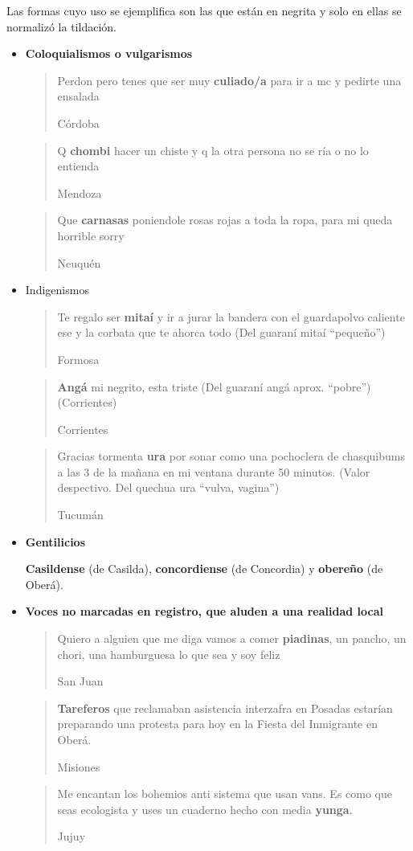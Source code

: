Las formas cuyo uso se ejemplifica son las que están en negrita y solo en ellas se normalizó la tildación.

\begin{itemize}
  
  \label{it:caracterizacionLinguistica}
  
  \item \textbf{Coloquialismos o vulgarismos}

    \blockquote[Córdoba]{Perdon pero tenes que ser muy \textbf{culiado/a} para ir a mc y pedirte una ensalada}


    \blockquote[Mendoza]{Q \textbf{chombi} hacer un chiste y q la otra persona no se ría o no lo entienda}

    \blockquote[Neuquén]{Que \textbf{carnasas} poniendole rosas rojas a toda la ropa, para mi queda horrible sorry}

\item Indigenismos

    \blockquote[Formosa]{Te regalo ser \textbf{mitaí} y ir a jurar la bandera con el guardapolvo caliente ese y la corbata que te ahorca todo (Del guaraní mitaí “pequeño”)}

    \blockquote[Corrientes]{\textbf{Angá} mi negrito, esta triste (Del guaraní angá aprox. “pobre”) (Corrientes)}

    \blockquote[Tucumán]{Gracias tormenta \textbf{ura} por sonar como una pochoclera de chasquibums a las 3 de la mañana en mi ventana durante 50 minutos. (Valor despectivo. Del quechua ura “vulva, vagina”) }

\item \textbf{Gentilicios}

  \textbf{Casildense} (de Casilda), \textbf{concordiense} (de Concordia) y \textbf{obereño} (de Oberá).

\item \textbf{Voces no marcadas en registro, que aluden a una realidad local}

  \blockquote[San Juan]{Quiero a alguien que me diga vamos a comer \textbf{piadinas}, un pancho, un chori, una hamburguesa lo que sea y soy feliz}

  \blockquote[Misiones]{\textbf{Tareferos} que reclamaban asistencia interzafra en Posadas estarían preparando una protesta para hoy en la Fiesta del Inmigrante en Oberá.}

  \blockquote[Jujuy]{Me encantan los bohemios anti sistema que usan vans. Es como que seas ecologista y uses un cuaderno hecho con media \textbf{yunga}.}


\end{itemize}

